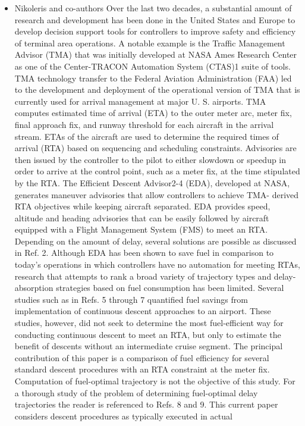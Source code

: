 \documentclass{aer1315-pretty}
\begin{document}
\begin{itemize}
\item Nikoleris and co-authors \cite{Niko:2012} 
    Over the last two decades, a substantial amount of research and development has been done in the United States
and Europe to develop decision support tools for controllers to improve safety and efficiency of terminal area
operations. A notable example is the Traffic Management Advisor (TMA) that was initially developed at NASA
Ames Research Center as one of the Center-TRACON Automation System (CTAS)1 suite of tools. TMA technology
transfer to the Federal Aviation Administration (FAA) led to the development and deployment of the operational
version of TMA that is currently used for arrival management at major U. S. airports. TMA computes estimated time
of arrival (ETA) to the outer meter arc, meter fix, final approach fix, and runway threshold for each aircraft in the
arrival stream. ETAs of the aircraft are used to determine the required times of arrival (RTA) based on sequencing
and scheduling constraints. Advisories are then issued by the controller to the pilot to either slowdown or speedup in
order to arrive at the control point, such as a meter fix, at the time stipulated by the RTA. The Efficient Descent
Advisor2-4 (EDA), developed at NASA, generates maneuver advisories that allow controllers to achieve TMA-
derived RTA objectives while keeping aircraft separated. EDA provides speed, altitude and heading advisories that
can be easily followed by aircraft equipped with a Flight Management System (FMS) to meet an RTA. Depending
on the amount of delay, several solutions are possible as discussed in Ref. 2. Although EDA has been shown to save
fuel in comparison to today’s operations in which controllers have no automation for meeting RTAs, research that
attempts to rank a broad variety of trajectory types and delay-absorption strategies based on fuel consumption has
been limited. Several studies such as in Refs. 5 through 7 quantified fuel savings from implementation of continuous
descent approaches to an airport. These studies, however, did not seek to determine the most fuel-efficient way for
conducting continuous descent to meet an RTA, but only to estimate the benefit of descents without an intermediate
cruise segment.
    The principal contribution of this paper is a comparison of fuel efficiency for several standard descent
procedures with an RTA constraint at the meter fix. Computation of fuel-optimal trajectory is not the objective of
this study. For a thorough study of the problem of determining fuel-optimal delay trajectories the reader is
referenced to Refs. 8 and 9. This current paper considers descent procedures as typically executed in actual

\end{itemize}
\end{document}
